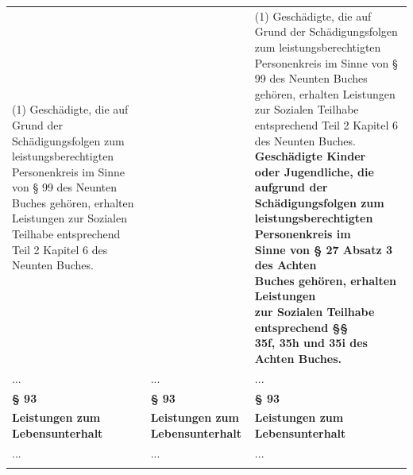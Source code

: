 \documentclass[10pt,a4paper,landscape]{article}
\begin{document}
\begin{longtable}{|L{8.2cm}|L{8.2cm}|L{8.2cm}|}
(1) Geschädigte, die auf Grund der  \newline Schädigungsfolgen zum  \newline leistungsberechtigten Personenkreis im  \newline Sinne von \S{} 99 des Neunten Buches  \newline gehören, erhalten Leistungen zur Sozialen  \newline Teilhabe entsprechend Teil 2 Kapitel 6 des  \newline Neunten Buches. &  & (1) Geschädigte, die auf Grund der  \newline Schädigungsfolgen zum  \newline leistungsberechtigten Personenkreis im  \newline Sinne von \S{} 99 des Neunten Buches  \newline gehören, erhalten Leistungen zur Sozialen  \newline Teilhabe entsprechend Teil 2 Kapitel 6 des  \newline Neunten Buches. \textbf{\textcolor{diffgreen}{Geschädigte Kinder  \newline oder Jugendliche, die aufgrund der  \newline Schädigungsfolgen zum  \newline leistungsberechtigten Personenkreis im  \newline Sinne von \S{} 27 Absatz 3 des Achten  \newline Buches gehören, erhalten Leistungen  \newline zur Sozialen Teilhabe entsprechend \S{}\S{}  \newline 35f, 35h und 35i des Achten Buches.}} \\
\hhline{|---|}
... & ... & ... \\
\hhline{|---|}
\textbf{\S{} 93} & \textbf{\S{} 93} & \textbf{\S{} 93} \\
\hhline{|---|}
\textbf{Leistungen zum Lebensunterhalt} & \textbf{Leistungen zum Lebensunterhalt} & \textbf{Leistungen zum Lebensunterhalt} \\
\hhline{|---|}
... & ... & ... \\
\hhline{|---|}
\end{longtable}
\newpage
\end{document}
